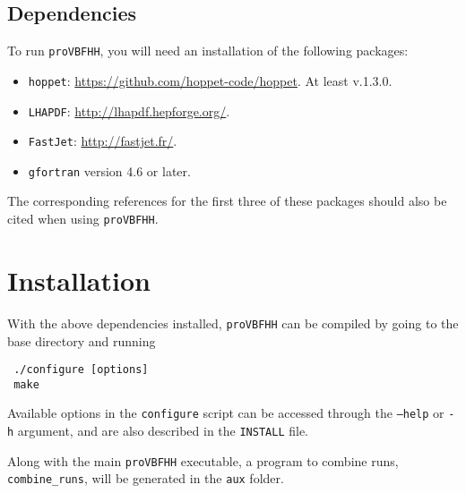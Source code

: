 \documentclass[12pt,a4]{article}
\newcommand{\provbfhh}{\texttt{proVBFHH}\xspace}
\begin{document}
\subsection{Dependencies}
To run \provbfhh, you will need an installation of the following packages:
\begin{itemize}
\item \texttt{hoppet}:
  \url{https://github.com/hoppet-code/hoppet}. At least v.1.3.0.
\item \texttt{LHAPDF}: \url{http://lhapdf.hepforge.org/}.
\item \texttt{FastJet}: \url{http://fastjet.fr/}.
\item \texttt{gfortran} version 4.6 or later.
\end{itemize}
%
The corresponding references for the first three of these packages
should also be cited when using \provbfhh.

\section{Installation}
With the above dependencies installed, \provbfhh can be compiled by
going to the base directory and running
\begin{verbatim}
 ./configure [options]
 make
\end{verbatim}
Available options in the \texttt{configure} script can be accessed
through the \texttt{--help} or \texttt{-h} argument, and are also
described in the \texttt{INSTALL} file.

Along with the main \provbfhh executable, a program to combine runs,
\texttt{combine\_runs}, will be generated in the \texttt{aux} folder.

\end{document}
